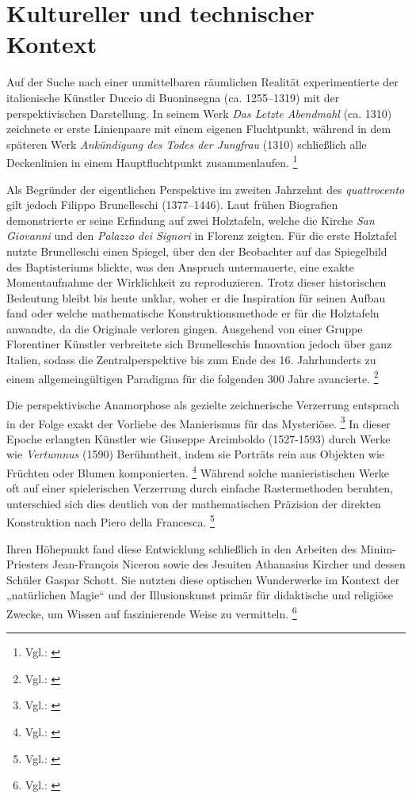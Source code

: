 \section{Kultureller und technischer Kontext}

Auf der Suche nach einer unmittelbaren räumlichen Realität experimentierte der italienische Künstler Duccio di Buoninsegna (ca. 1255–1319) mit der perspektivischen Darstellung. In seinem Werk \textit{Das Letzte Abendmahl} (ca. 1310) zeichnete er erste Linienpaare mit einem eigenen Fluchtpunkt, während in dem späteren Werk \textit{Ankündigung des Todes der Jungfrau} (1310) schließlich alle Deckenlinien in einem Hauptfluchtpunkt zusammenlaufen. \footnote{Vgl.: \cite[S. 4-9]{Andersen2007}}

Als Begründer der eigentlichen Perspektive im zweiten Jahrzehnt des \textit{quattrocento} gilt jedoch Filippo Brunelleschi (1377–1446). Laut frühen Biografien demonstrierte er seine Erfindung auf zwei Holztafeln, welche die Kirche \textit{San Giovanni} und den \textit{Palazzo dei Signori} in Florenz zeigten. Für die erste Holztafel nutzte Brunelleschi einen Spiegel, über den der Beobachter auf das Spiegelbild des Baptisteriums blickte, was den Anspruch untermauerte, eine exakte Momentaufnahme der Wirklichkeit zu reproduzieren. Trotz dieser historischen Bedeutung bleibt bis heute unklar, woher er die Inspiration für seinen Aufbau fand oder welche mathematische Konstruktionsmethode er für die Holztafeln anwandte, da die Originale verloren gingen. Ausgehend von einer Gruppe Florentiner Künstler verbreitete sich Brunelleschis Innovation jedoch über ganz Italien, sodass die Zentralperspektive bis zum Ende des 16. Jahrhunderts zu einem allgemeingültigen Paradigma für die folgenden 300 Jahre avancierte. \footnote{Vgl.: \cite[S. 11-14]{Andersen2007}}

Die perspektivische Anamorphose als gezielte zeichnerische Verzerrung entsprach in der Folge exakt der Vorliebe des Manierismus für das Mysteriöse. \footnote{Vgl.: \cite[S. 71-75]{Andersen2007}} In dieser Epoche erlangten Künstler wie Giuseppe Arcimboldo (1527-1593) durch Werke wie \textit{Vertumnus} (1590) Berühmtheit, indem sie Porträts rein aus Objekten wie Früchten oder Blumen komponierten. \footnote{Vgl.: \cite{Kemp1990}} Während solche manieristischen Werke oft auf einer spielerischen Verzerrung durch einfache Rastermethoden beruhten, unterschied sich dies deutlich von der mathematischen Präzision der direkten Konstruktion nach Piero della Francesca. \footnote{Vgl.: \cite[S. 74-75]{Andersen2007}}

Ihren Höhepunkt fand diese Entwicklung schließlich in den Arbeiten des Minim-Priesters Jean-François Niceron sowie des Jesuiten Athanasius Kircher und dessen Schüler Gaspar Schott. Sie nutzten diese optischen Wunderwerke im Kontext der „natürlichen Magie“ und der Illusionskunst primär für didaktische und religiöse Zwecke, um Wissen auf faszinierende Weise zu vermitteln. \footnote{Vgl.: \cite[S. 609-611]{Andersen2007}}